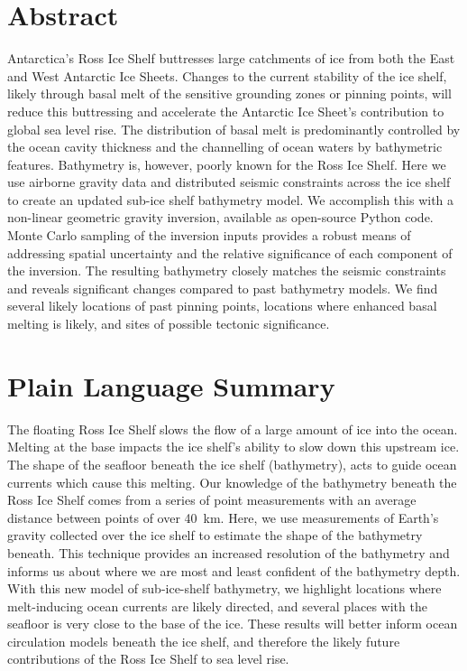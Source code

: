 
\section*{Abstract}

Antarctica's Ross Ice Shelf buttresses large catchments of ice from both the East and West Antarctic Ice Sheets. Changes to the current stability of the ice shelf, likely through basal melt of the sensitive grounding zones or pinning points, will reduce this buttressing and accelerate the Antarctic Ice Sheet's contribution to global sea level rise. The distribution of basal melt is predominantly controlled by the ocean cavity thickness and the channelling of ocean waters by bathymetric features. Bathymetry is, however, poorly known for the Ross Ice Shelf. Here we use airborne gravity data and distributed seismic constraints across the ice shelf to create an updated sub-ice shelf bathymetry model. We accomplish this with a non-linear geometric gravity inversion, available as open-source Python code. Monte Carlo sampling of the inversion inputs provides a robust means of addressing spatial uncertainty and the relative significance of each component of the inversion. The resulting bathymetry closely matches the seismic constraints and reveals significant changes compared to past bathymetry models. We find several likely locations of past pinning points, locations where enhanced basal melting is likely, and sites of possible tectonic significance.


\section*{Plain Language Summary}

The floating Ross Ice Shelf slows the flow of a large amount of ice into the ocean. Melting at the base impacts the ice shelf's ability to slow down this upstream ice. The shape of the seafloor beneath the ice shelf (bathymetry), acts to guide ocean currents which cause this melting. Our knowledge of the bathymetry beneath the Ross Ice Shelf comes from a series of point measurements with an average distance between points of over 40~km. Here, we use measurements of Earth's gravity collected over the ice shelf to estimate the shape of the bathymetry beneath. This technique provides an increased resolution of the bathymetry and informs us about where we are most and least confident of the bathymetry depth. With this new model of sub-ice-shelf bathymetry, we highlight locations where melt-inducing ocean currents are likely directed, and several places with the seafloor is very close to the base of the ice. These results will better inform ocean circulation models beneath the ice shelf, and therefore the likely future contributions of the Ross Ice Shelf to sea level rise.


